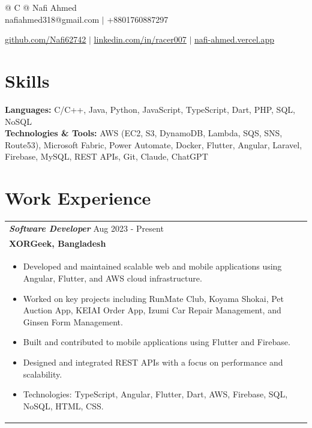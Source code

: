 \documentclass[a4paper,8pt]{article}
\begin{document}
\pagestyle{empty}

\begin{tabularx}{\linewidth}{@{} C @{}}
\color[HTML]{1C033C} \Huge{Nafi Ahmed} \\[4pt]
\textcolor[HTML]{371e77}{{{{\faEnvelope} nafiahmed318@gmail.com}} $|$}
\textcolor[HTML]{371e77}{{{\faMobile} +8801760887297}}

\textcolor[HTML]{371e77}{\underline{{\raisebox{-0.05\height}{\faGithub} \href{https://github.com/Nafi62742}{github.com/Nafi62742}}} $|$}
\textcolor[HTML]{371e77}{\underline{{\raisebox{-0.05\height}{\faLinkedin} \href{https://linkedin.com/in/racer007}{linkedin.com/in/racer007}}} $|$}
\textcolor[HTML]{371e77}{\underline{{\raisebox{-0.05\height}{\faGlobe} \href{https://nafi-ahmed.vercel.app}{nafi-ahmed.vercel.app}}}}
\end{tabularx}

\vspace{1pt}
\section{Skills}
\color[HTML]{1C033C}\textbf{Languages:} C/C++, Java, Python, JavaScript, TypeScript, Dart, PHP, SQL, NoSQL\\[1.5pt]
\color[HTML]{1C033C}\textbf{Technologies \& Tools:} AWS (EC2, S3, DynamoDB, Lambda, SQS, SNS, Route53), Microsoft Fabric, Power Automate, Docker, Flutter, Angular, Laravel, Firebase, MySQL, REST APIs, Git, Claude, ChatGPT\\[2pt]

\vspace{1pt}
\section{Work Experience}

\begin{tabularx}{\linewidth}{ @{}l r@{} }
\color[HTML]{371e77}\textbf{\textit{Software Developer}} \hfill \color[HTML]{371e77} Aug 2023 - Present \\[2pt]
\textbf{{XORGeek, Bangladesh}} \hfill \\[2.5pt]
\begin{minipage}[t]{\linewidth}
\begin{itemize}[nosep,after=\strut, leftmargin=1.5em, itemsep=1.5pt]
\item Developed and maintained scalable web and mobile applications using Angular, Flutter, and AWS cloud infrastructure.
\item Worked on key projects including RunMate Club, Koyama Shokai, Pet Auction App, KEIAI Order App, Izumi Car Repair Management, and Ginsen Form Management.
\item Built and contributed to mobile applications using Flutter and Firebase.
\item Designed and integrated REST APIs with a focus on performance and scalability.
\item Technologies: TypeScript, Angular, Flutter, Dart, AWS, Firebase, SQL, NoSQL, HTML, CSS.
\end{itemize}
\end{minipage}
\end{tabularx}
\end{document}
